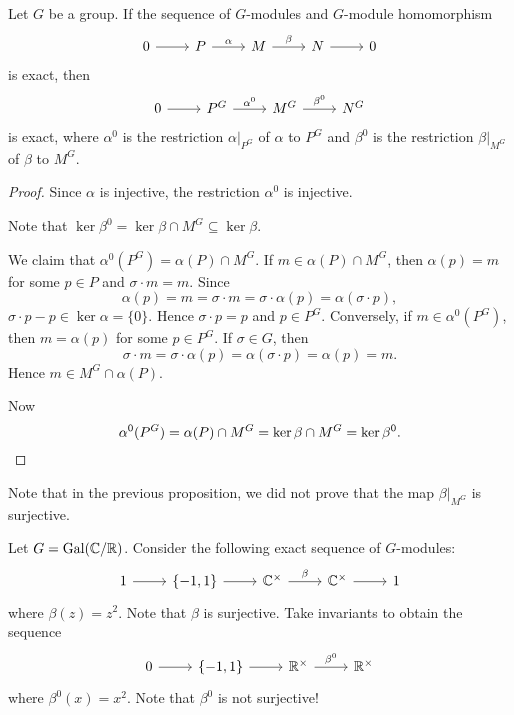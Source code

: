 \begin{proposition}
\label{pro:H0}
    Let $G$ be a group. If the sequence
of $G$-modules and $G$-module homomorphism
\[
\begin{tikzcd}
    0 & P & M & N & 0
    \arrow[from=1-1, to=1-2]
    \arrow["\alpha", from=1-2, to=1-3]
    \arrow["\beta", from=1-3, to=1-4]
    \arrow[from=1-4, to=1-5]
    \end{tikzcd}\]
is exact, then 
\[
\begin{tikzcd}
                        0 & P^G & M^G & N^G 
                        \arrow[from=1-1, to=1-2]
                        \arrow["\alpha^0", from=1-2, to=1-3]
                        \arrow["\beta^0", from=1-3, to=1-4]
        \end{tikzcd}
        \]
is exact, where $\alpha^0$ is the restriction $\alpha|_{P^G}$ of $\alpha$ to $P^G$ and
$\beta^0$ is the restriction $\beta|_{M^G}$ of $\beta$ to $M^G$. 
\end{proposition}

\begin{proof}
    Since $\alpha$ is injective, the restriction $\alpha^0$ is injective. 

    Note that 
    $\ker\beta^0=\ker\beta\cap M^G\subseteq\ker\beta$. 
    
    We claim 
    that $\alpha^0(P^G)=\alpha(P)\cap M^G$. If $m\in\alpha(P)\cap M^G$, then 
    $\alpha(p)=m$ for some $p\in P$ and $\sigma\cdot m=m$. Since
    \[
    \alpha(p)=m=\sigma\cdot m=\sigma\cdot\alpha(p)=\alpha(\sigma\cdot p),
    \]
    $\sigma\cdot p-p\in\ker\alpha=\{0\}$. Hence $\sigma\cdot p=p$ and
    $p\in P^G$. Conversely, if $m\in\alpha^0(P^G)$, then 
    $m=\alpha(p)$ for some $p\in P^G$. If $\sigma\in G$, then
    \[
    \sigma\cdot m=\sigma\cdot\alpha(p)=\alpha(\sigma\cdot p)=\alpha(p)=m.
    \]
    Hence $m\in M^G\cap\alpha(P)$.

    Now
    \[
    \alpha^0(P^G)=\alpha(P)\cap M^G=\ker\beta\cap M^G=\ker\beta^0.\qedhere  
    \]
\end{proof}

Note that in the previous proposition, we did not prove that
the map $\beta|_{M^G}$ is surjective. 

\begin{example}
    Let $G=\operatorname{Gal}(\mathbb{C}/\mathbb{R})$. Consider the following exact sequence
    of $G$-modules:
    \[
    \begin{tikzcd}
    1 & \{-1,1\} & \C^\times & \C^\times & 1
    \arrow[from=1-1, to=1-2]
    \arrow[from=1-2, to=1-3]
    \arrow["\beta", from=1-3, to=1-4]
    \arrow[from=1-4, to=1-5]
    \end{tikzcd}    
    \]
    where $\beta(z)=z^2$. Note that $\beta$ is surjective. Take invariants 
    to obtain the sequence  
    \[
    \begin{tikzcd}
     0 & \{-1,1\} & \R^\times & \R^\times 
     \arrow[from=1-1, to=1-2]
     \arrow[from=1-2, to=1-3]
     \arrow["\beta^0", from=1-3, to=1-4]
     \end{tikzcd}
     \]
     where $\beta^0(x)=x^2$. Note that $\beta^0$ is not surjective! 
\end{example}

